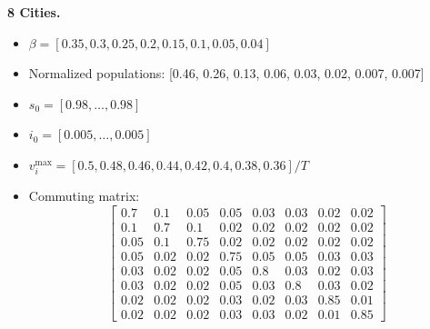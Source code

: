 \documentclass[letterpaper, 10 pt, conference]{ieeeconf}
\begin{document}
\textbf{8 Cities.}
\begin{itemize}
  \item $\beta = [0.35, 0.3, 0.25, 0.2, 0.15, 0.1, 0.05, 0.04]$
  \item Normalized populations: [0.46, 0.26, 0.13, 0.06, 0.03, 0.02, 0.007, 0.007]
  \item $s_0 = [0.98,\ldots,0.98]$
  \item $i_0 = [0.005,\ldots,0.005]$
  \item $v_i^{\max} \!=\! [0.5, 0.48, 0.46, 0.44, 0.42, 0.4, 0.38, 0.36] / T$
  \item Commuting matrix:
  \[
  \begin{bmatrix}
    0.7 & 0.1 & 0.05 & 0.05 & 0.03 & 0.03 & 0.02 & 0.02 \\
    0.1 & 0.7 & 0.1 & 0.02 & 0.02 & 0.02 & 0.02 & 0.02 \\
    0.05 & 0.1 & 0.75 & 0.02 & 0.02 & 0.02 & 0.02 & 0.02 \\
    0.05 & 0.02 & 0.02 & 0.75 & 0.05 & 0.05 & 0.03 & 0.03 \\
    0.03 & 0.02 & 0.02 & 0.05 & 0.8 & 0.03 & 0.02 & 0.03 \\
    0.03 & 0.02 & 0.02 & 0.05 & 0.03 & 0.8 & 0.03 & 0.02 \\
    0.02 & 0.02 & 0.02 & 0.03 & 0.02 & 0.03 & 0.85 & 0.01 \\
    0.02 & 0.02 & 0.02 & 0.03 & 0.03 & 0.02 & 0.01 & 0.85
  \end{bmatrix}
  \]
\end{itemize}



\end{document}
